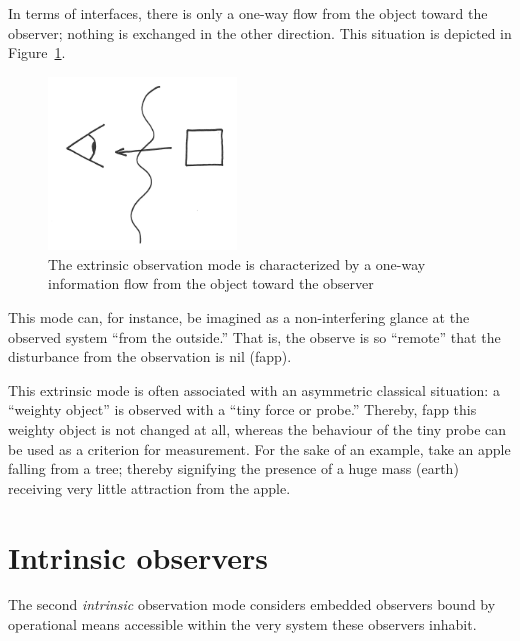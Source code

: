 In terms of interfaces, there is only a one-way flow from the object toward the observer; nothing is exchanged in the other direction.
This situation is depicted   in Figure~\ref{2016-pu-book-chapter-eo-figure-extrinsic}.
\begin{figure}
\begin{center}
\includegraphics[width=5cm,angle=2]{2016-pu-book-chapter-eo-figure-extrinsic}
\end{center}
\caption{
The extrinsic observation mode is characterized by a one-way information flow from the object toward the observer
\label{2016-pu-book-chapter-eo-figure-extrinsic}
}
\end{figure}

This mode can, for instance, be imagined as a non-interfering glance at the observed system ``from the outside.''
That is, the observe is so ``remote'' that the disturbance from the observation is nil (fapp).

This extrinsic mode is often associated with an asymmetric classical situation: a ``weighty object'' is observed with a ``tiny force or probe.''
Thereby, fapp this weighty object is not changed at all, whereas the behaviour of the tiny probe can be used as a criterion for measurement.
For the sake of an example, take an apple falling from a tree; thereby signifying the presence of a huge mass (earth)
receiving very little attraction from the apple.

\section{Intrinsic observers}

The second {\em intrinsic} observation mode considers embedded observers
bound by operational means accessible within the very system these observers inhabit.

